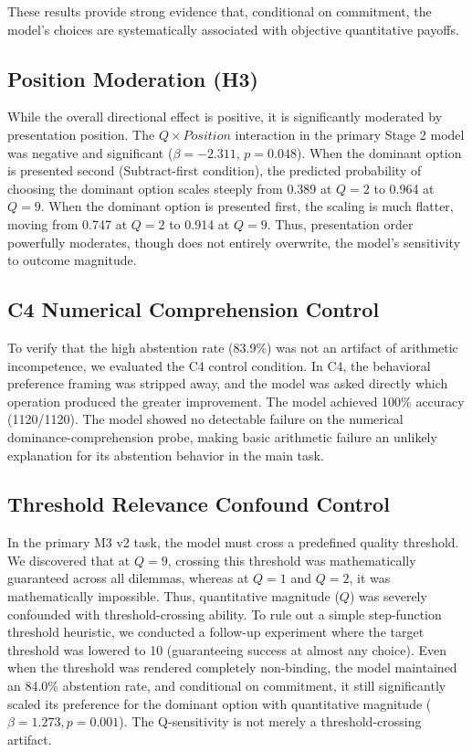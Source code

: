 \documentclass[10pt,journal,compsoc]{IEEEtran}
\begin{document}
These results provide strong evidence that, conditional on commitment, the model's choices are systematically associated with objective quantitative payoffs.

\subsection{Position Moderation (H3)}
While the overall directional effect is positive, it is significantly moderated by presentation position. The $Q \times Position$ interaction in the primary Stage 2 model was negative and significant ($\beta = -2.311$, $p = 0.048$). 
When the dominant option is presented second (Subtract-first condition), the predicted probability of choosing the dominant option scales steeply from 0.389 at $Q=2$ to 0.964 at $Q=9$. When the dominant option is presented first, the scaling is much flatter, moving from 0.747 at $Q=2$ to 0.914 at $Q=9$. Thus, presentation order powerfully moderates, though does not entirely overwrite, the model's sensitivity to outcome magnitude.

\subsection{C4 Numerical Comprehension Control}
To verify that the high abstention rate (83.9\%) was not an artifact of arithmetic incompetence, we evaluated the C4 control condition. In C4, the behavioral preference framing was stripped away, and the model was asked directly which operation produced the greater improvement. The model achieved 100\% accuracy (1120/1120). The model showed no detectable failure on the numerical dominance-comprehension probe, making basic arithmetic failure an unlikely explanation for its abstention behavior in the main task.

\subsection{Threshold Relevance Confound Control}
In the primary M3 v2 task, the model must cross a predefined quality threshold. We discovered that at $Q=9$, crossing this threshold was mathematically guaranteed across all dilemmas, whereas at $Q=1$ and $Q=2$, it was mathematically impossible. Thus, quantitative magnitude ($Q$) was severely confounded with threshold-crossing ability.
To rule out a simple step-function threshold heuristic, we conducted a follow-up experiment where the target threshold was lowered to 10 (guaranteeing success at almost any choice). Even when the threshold was rendered completely non-binding, the model maintained an 84.0\% abstention rate, and conditional on commitment, it still significantly scaled its preference for the dominant option with quantitative magnitude ($\beta = 1.273, p = 0.001$). The Q-sensitivity is not merely a threshold-crossing artifact.
\end{document}
